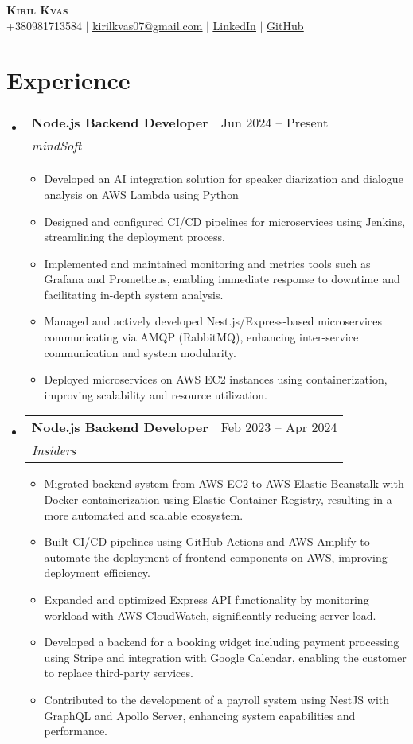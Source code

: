 \documentclass[letterpaper,11pt]{article}
\makeatletter
\newcommand{\resumeItem}[1]{
  \item\small{
    {#1 \vspace{-2pt}}
  }
}
\newcommand{\resumeSubheading}[4]{
  \vspace{-2pt}\item
    \begin{tabular*}{0.97\textwidth}[t]{l@{\extracolsep{\fill}}r}
      \textbf{#1} & #2 \\
      \textit{\small#3} & \textit{\small #4} \\
    \end{tabular*}\vspace{-7pt}
}
\newcommand{\resumeSubHeadingListStart}{\begin{itemize}[leftmargin=0.15in, label={}]}
\newcommand{\resumeSubHeadingListEnd}{\end{itemize}}
\newcommand{\resumeItemListStart}{\begin{itemize}}
\newcommand{\resumeItemListEnd}{\end{itemize}\vspace{-5pt}}
\makeatother
\begin{document}
\begin{center}
    \textbf{\Huge \scshape Kiril Kvas} \\ \vspace{1pt}
    \small +380981713584 $|$ \href{mailto:kirilkvas07@gmail.com}{\underline{kirilkvas07@gmail.com}} $|$ 
    \href{https://www.linkedin.com/in/kiril-kvas-999154239/}{\underline{LinkedIn}} $|$
    \href{https://github.com/rillsvai}{\underline{GitHub}}
\end{center}

\section{Experience}
\resumeSubHeadingListStart
    \resumeSubheading
      {Node.js Backend Developer}{Jun 2024 -- Present}
      {mindSoft}{}
      \resumeItemListStart
        \resumeItem{Developed an AI integration solution for speaker diarization and dialogue analysis on AWS Lambda using Python}
        \resumeItem{Designed and configured CI/CD pipelines for microservices using Jenkins, streamlining the deployment process.}
        \resumeItem{Implemented and maintained monitoring and metrics tools such as Grafana and Prometheus, enabling immediate response to downtime and facilitating in-depth system analysis.}
        \resumeItem{Managed and actively developed Nest.js/Express-based microservices communicating via AMQP (RabbitMQ), enhancing inter-service communication and system modularity.}
        \resumeItem{Deployed microservices on AWS EC2 instances using containerization, improving scalability and resource utilization.}
      \resumeItemListEnd
\resumeSubHeadingListEnd

\resumeSubHeadingListStart
    \resumeSubheading
      {Node.js Backend Developer}{Feb 2023 -- Apr 2024}
      {Insiders}{}
      \resumeItemListStart
            \resumeItem{Migrated backend system from AWS EC2 to AWS Elastic Beanstalk with Docker containerization using Elastic Container Registry, resulting in a more automated and scalable ecosystem.}
            \resumeItem{Built CI/CD pipelines using GitHub Actions and AWS Amplify to automate the deployment of frontend components on AWS, improving deployment efficiency.}
            \resumeItem{Expanded and optimized Express API functionality by monitoring workload with AWS CloudWatch, significantly reducing server load.}
            \resumeItem{Developed a backend for a booking widget including payment processing using Stripe and integration with Google Calendar, enabling the customer to replace third-party services.}
            \resumeItem{Contributed to the development of a payroll system using NestJS with GraphQL and Apollo Server, enhancing system capabilities and performance.}
      \resumeItemListEnd
\resumeSubHeadingListEnd
\end{document}
